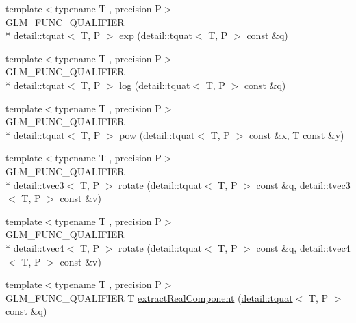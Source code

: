 \begin{DoxyCompactItemize}
\item 
{\footnotesize template$<$typename T , precision P$>$ }\\G\-L\-M\-\_\-\-F\-U\-N\-C\-\_\-\-Q\-U\-A\-L\-I\-F\-I\-E\-R \\*
\hyperlink{structglm_1_1detail_1_1tquat}{detail\-::tquat}$<$ T, P $>$ \hyperlink{group__gtx__quaternion_gaadebfad5c8b4b3dde114915f0494b739}{exp} (\hyperlink{structglm_1_1detail_1_1tquat}{detail\-::tquat}$<$ T, P $>$ const \&q)
\item 
{\footnotesize template$<$typename T , precision P$>$ }\\G\-L\-M\-\_\-\-F\-U\-N\-C\-\_\-\-Q\-U\-A\-L\-I\-F\-I\-E\-R \\*
\hyperlink{structglm_1_1detail_1_1tquat}{detail\-::tquat}$<$ T, P $>$ \hyperlink{group__gtx__quaternion_ga832e6b69f9e5f596cad8bada9ebb4477}{log} (\hyperlink{structglm_1_1detail_1_1tquat}{detail\-::tquat}$<$ T, P $>$ const \&q)
\item 
{\footnotesize template$<$typename T , precision P$>$ }\\G\-L\-M\-\_\-\-F\-U\-N\-C\-\_\-\-Q\-U\-A\-L\-I\-F\-I\-E\-R \\*
\hyperlink{structglm_1_1detail_1_1tquat}{detail\-::tquat}$<$ T, P $>$ \hyperlink{group__gtx__quaternion_ga9c9854d641f71f853cfed9dc5d4ef762}{pow} (\hyperlink{structglm_1_1detail_1_1tquat}{detail\-::tquat}$<$ T, P $>$ const \&x, T const \&y)
\item 
{\footnotesize template$<$typename T , precision P$>$ }\\G\-L\-M\-\_\-\-F\-U\-N\-C\-\_\-\-Q\-U\-A\-L\-I\-F\-I\-E\-R \\*
\hyperlink{structglm_1_1detail_1_1tvec3}{detail\-::tvec3}$<$ T, P $>$ \hyperlink{group__gtx__quaternion_gaa4ac5806c1c001ac0247b1e1fd07dddf}{rotate} (\hyperlink{structglm_1_1detail_1_1tquat}{detail\-::tquat}$<$ T, P $>$ const \&q, \hyperlink{structglm_1_1detail_1_1tvec3}{detail\-::tvec3}$<$ T, P $>$ const \&v)
\item 
{\footnotesize template$<$typename T , precision P$>$ }\\G\-L\-M\-\_\-\-F\-U\-N\-C\-\_\-\-Q\-U\-A\-L\-I\-F\-I\-E\-R \\*
\hyperlink{structglm_1_1detail_1_1tvec4}{detail\-::tvec4}$<$ T, P $>$ \hyperlink{group__gtx__quaternion_ga3461e43b8c7da533b10bc5e9961add80}{rotate} (\hyperlink{structglm_1_1detail_1_1tquat}{detail\-::tquat}$<$ T, P $>$ const \&q, \hyperlink{structglm_1_1detail_1_1tvec4}{detail\-::tvec4}$<$ T, P $>$ const \&v)
\item 
{\footnotesize template$<$typename T , precision P$>$ }\\G\-L\-M\-\_\-\-F\-U\-N\-C\-\_\-\-Q\-U\-A\-L\-I\-F\-I\-E\-R T \hyperlink{group__gtx__quaternion_gaad86e595f0021253cb9d34ca32f27f3c}{extract\-Real\-Component} (\hyperlink{structglm_1_1detail_1_1tquat}{detail\-::tquat}$<$ T, P $>$ const \&q)

\end{DoxyCompactItemize}
